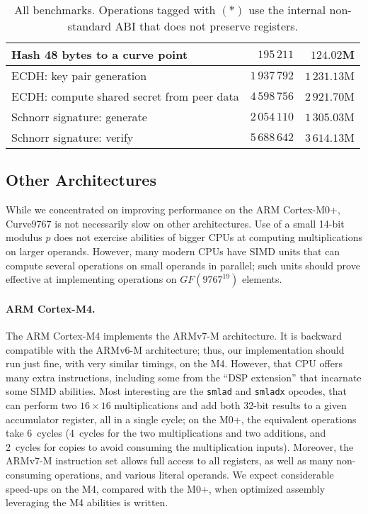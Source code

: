 \documentclass{llncs}
\newcommand{\GF}{GF}
\begin{document}
\begin{table}[H]
\begin{center}
\begin{tabular}{|l|r|r|}
Hash 48 bytes to a curve point                &    $195\,211$ &    $124.02$M \\
    \hline
ECDH: key pair generation                     & $1\,937\,792$ & $1\,231.13$M \\
ECDH: compute shared secret from peer data    & $4\,598\,756$ & $2\,921.70$M \\
Schnorr signature: generate                   & $2\,054\,110$ & $1\,305.03$M \\
Schnorr signature: verify                     & $5\,688\,642$ & $3\,614.13$M \\
    \hline
    \end{tabular}
\end{center}
    \caption{\label{tab:benchmarks}All benchmarks. Operations tagged with
    $(*)$ use the internal non-standard ABI that does not preserve
    registers.}
\end{table}

\subsection{Other Architectures}

While we concentrated on improving performance on the ARM Cortex-M0+,
Curve9767 is not necessarily slow on other architectures. Use of a small
14-bit modulus $p$ does not exercise abilities of bigger CPUs at
computing multiplications on larger operands. However, many modern CPUs
have SIMD units that can compute several operations on small operands in
parallel; such units should prove effective at implementing operations
on $\GF(9767^{19})$ elements.

\paragraph{ARM Cortex-M4.}

The ARM Cortex-M4 implements the ARMv7-M architecture. It is backward
compatible with the ARMv6-M architecture; thus, our implementation
should run just fine, with very similar timings, on the M4. However,
that CPU offers many extra instructions, including some from the ``DSP
extension'' that incarnate some SIMD abilities. Most interesting are the
\verb+smlad+ and \verb+smladx+ opcodes, that can perform two
$16\times16$ multiplications and add both 32-bit results to a given
accumulator register, all in a single cycle; on the M0+, the equivalent
operations take 6~cycles (4~cycles for the two multiplications and two
additions, and 2~cycles for copies to avoid consuming the multiplication
inputs). Moreover, the ARMv7-M instruction set allows full access to all
registers, as well as many non-consuming operations, and various literal
operands. We expect considerable speed-ups on the M4, compared with the
M0+, when optimized assembly leveraging the M4 abilities is written.
\end{document}
